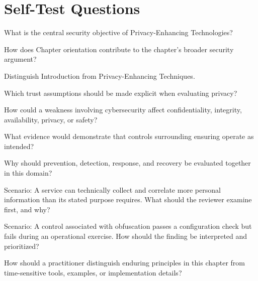 \documentclass[11pt,letterpaper]{article}
\begin{document}
\section*{Self-Test Questions}
\begin{CornellRecallList}
\item What is the central security objective of Privacy-Enhancing Technologies?
\item How does Chapter orientation contribute to the chapter's broader security argument?
\item Distinguish Introduction from Privacy-Enhancing Techniques.
\item Which trust assumptions should be made explicit when evaluating privacy?
\item How could a weakness involving cybersecurity affect confidentiality, integrity, availability, privacy, or safety?
\item What evidence would demonstrate that controls surrounding ensuring operate as intended?
\item Why should prevention, detection, response, and recovery be evaluated together in this domain?
\item Scenario: A service can technically collect and correlate more personal information than its stated purpose requires. What should the reviewer examine first, and why?
\item Scenario: A control associated with obfuscation passes a configuration check but fails during an operational exercise. How should the finding be interpreted and prioritized?
\item How should a practitioner distinguish enduring principles in this chapter from time-sensitive tools, examples, or implementation details?
\end{CornellRecallList}
\end{document}
